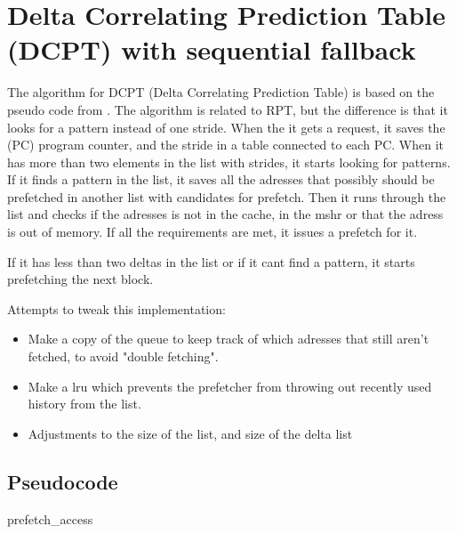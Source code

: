 \documentclass[12pt,journal,compsoc]{IEEEtran}
\begin{document}
\section{Delta Correlating Prediction Table (DCPT) with sequential fallback}
The algorithm for DCPT (Delta Correlating Prediction Table) is based on the pseudo code from \cite{dcptpaper}.
The algorithm is related to RPT, but the difference is that it looks for a pattern instead of one stride.
When the it gets a request, it saves the (PC) program counter, and the stride in a table connected to each PC. When it has more than two elements in the list with strides, it starts looking for patterns.
If it finds a pattern in the list, it saves all the adresses that possibly should be prefetched in another list with candidates for prefetch.
Then it runs through the list and checks if the adresses is not in the cache, in the mshr or that the adress is out of memory. If all the requirements are met, it issues a prefetch for it.

If it has less than two deltas in the list or if it cant find a pattern, it starts prefetching the next block.

Attempts to tweak this implementation:
\begin{itemize}
\item Make a copy of the queue to keep track of which adresses that still aren't fetched, to avoid "double fetching".
\item Make a lru which prevents the prefetcher from throwing out recently used history from the list.
\item Adjustments to the size of the list, and size of the delta list
\end{itemize}

\subsection{Pseudocode}

\begin{algorithm}[H]
\dontprintsemicolon
{}

\caption{prefetch\_access\label{pa}}
\end{algorithm}
\end{document}
